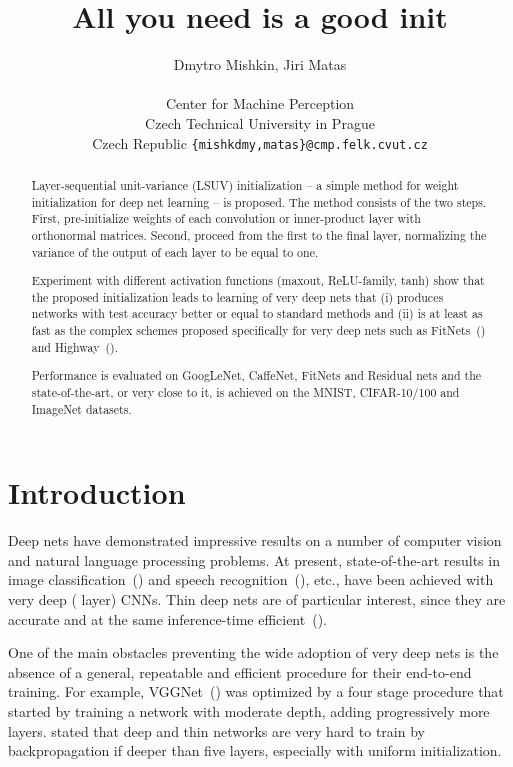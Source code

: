 \documentclass{article} \clearpage{}\usepackage{iclr2016_conference,times}
\title{All you need is a good init}
\author{Dmytro Mishkin, Jiri Matas  \\
\\
Center for Machine Perception\\
 Czech Technical University in Prague\\
 Czech Republic
\texttt{\{mishkdmy,matas\}@cmp.felk.cvut.cz} \\
}
\begin{document}
\maketitle
\begin{abstract}
Layer-sequential unit-variance (LSUV) initialization --  a simple method for weight initialization for deep net learning -- is proposed. The method consists of the two steps. First, pre-initialize weights of each convolution or inner-product layer with orthonormal matrices. Second, proceed from the first to the final layer, normalizing the variance of the output of each layer to be equal to one.

Experiment with different activation functions (maxout, ReLU-family, tanh) show that the proposed initialization leads to learning of very deep nets that (i) produces networks with test accuracy better or equal to standard methods and (ii) is at least as fast as the complex schemes proposed specifically for very deep nets such as FitNets~(\cite{FitNets2014}) and Highway~(\cite{Highway2015}). 

Performance is evaluated on GoogLeNet, CaffeNet, FitNets and Residual nets and the state-of-the-art, or very close to it, is achieved on the MNIST, CIFAR-10/100 and ImageNet datasets.
\end{abstract}

\section{Introduction}
\label{intro}
Deep nets have demonstrated impressive results on a number of computer vision and natural language processing problems. 
At present, state-of-the-art results in image classification~(\cite{VGGNet2015,Googlenet2015}) and speech recognition~(\cite{VGGNetSound2015}), etc., have been achieved with very deep ( layer) CNNs.
Thin deep nets are of particular interest, since they are accurate and at the same inference-time efficient~(\cite{FitNets2014}).

One of the main obstacles preventing the wide adoption of very deep nets is the absence of a general, repeatable and efficient procedure for their end-to-end training. 
For example, VGGNet~(\cite{VGGNet2015}) was optimized by a four stage procedure that started by training a network with moderate depth, adding progressively more layers.
\cite{FitNets2014} stated that deep and thin networks are very hard to train by backpropagation if deeper than five layers, especially with uniform initialization.
\end{document}
